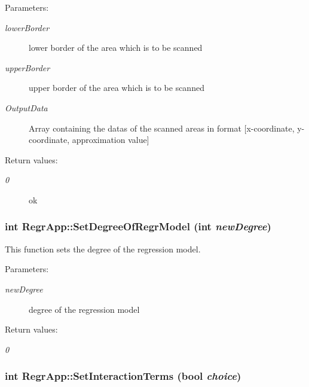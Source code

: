\begin{Desc}
\item[Parameters:]
\begin{description}
\item[{\em lower\-Border}]lower border of the area which is to be scanned \item[{\em upper\-Border}]upper border of the area which is to be scanned \item[{\em Output\-Data}]Array containing the datas of the scanned areas in format [x-coordinate, y-coordinate, approximation value] \end{description}
\end{Desc}
\begin{Desc}
\item[Return values:]
\begin{description}
\item[{\em 0}]ok \end{description}
\end{Desc}
\subsubsection{\setlength{\rightskip}{0pt plus 5cm}int Regr\-App::Set\-Degree\-Of\-Regr\-Model (int {\em new\-Degree})}\label{classRegrApp_fc1e2a46caf8b952fafa463a1ee47772}


This function sets the degree of the regression model. 

\begin{Desc}
\item[Parameters:]
\begin{description}
\item[{\em new\-Degree}]degree of the regression model \end{description}
\end{Desc}
\begin{Desc}
\item[Return values:]
\begin{description}
\item[{\em 0}]\end{description}
\end{Desc}
\subsubsection{\setlength{\rightskip}{0pt plus 5cm}int Regr\-App::Set\-Interaction\-Terms (bool {\em choice})}\label{classRegrApp_64e327dfa4e326022f3e3a6057dd48c6}


